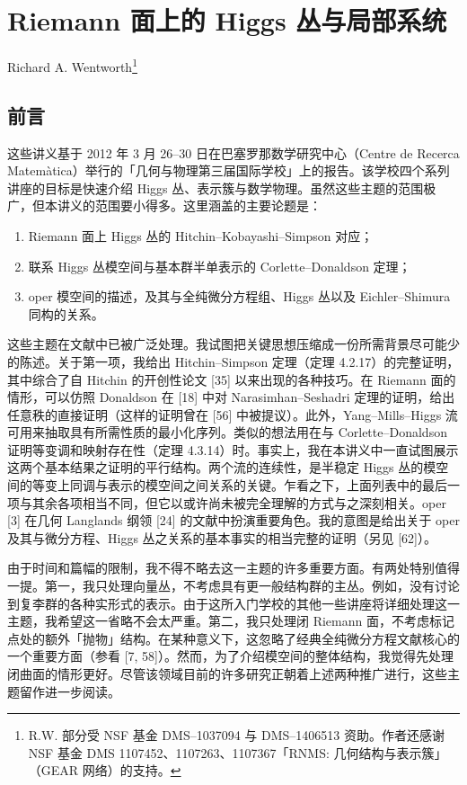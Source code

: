 \chapter{Riemann 面上的 Higgs 丛与局部系统}
\label{chap:04}

\noindent Richard A. Wentworth\footnote{R.W. 部分受 NSF 基金 DMS--1037094 与 DMS--1406513 资助。作者还感谢 NSF 基金 DMS 1107452、1107263、1107367「RNMS: 几何结构与表示簇」（GEAR 网络）的支持。}

\section{前言}

这些讲义基于 2012 年 3 月 26--30 日在巴塞罗那数学研究中心（Centre de Recerca Matem\`atica）举行的「几何与物理第三届国际学校」上的报告。该学校四个系列讲座的目标是快速介绍 Higgs 丛、表示簇与数学物理。虽然这些主题的范围极广，但本讲义的范围要小得多。这里涵盖的主要论题是：

\begin{enumerate}[label=(\roman*), leftmargin=2.6em, itemsep=0.2em]
\item Riemann 面上 Higgs 丛的 Hitchin--Kobayashi--Simpson 对应；
\item 联系 Higgs 丛模空间与基本群半单表示的 Corlette--Donaldson 定理；
\item oper 模空间的描述，及其与全纯微分方程组、Higgs 丛以及 Eichler--Shimura 同构的关系。
\end{enumerate}

这些主题在文献中已被广泛处理。我试图把关键思想压缩成一份所需背景尽可能少的陈述。关于第一项，我给出 Hitchin--Simpson 定理（定理 4.2.17）的完整证明，其中综合了自 Hitchin 的开创性论文 [35] 以来出现的各种技巧。在 Riemann 面的情形，可以仿照 Donaldson 在 [18] 中对 Narasimhan--Seshadri 定理的证明，给出任意秩的直接证明（这样的证明曾在 [56] 中被提议）。此外，Yang--Mills--Higgs 流可用来抽取具有所需性质的最小化序列。类似的想法用在与 Corlette--Donaldson 证明等变调和映射存在性（定理 4.3.14）时。事实上，我在本讲义中一直试图展示这两个基本结果之证明的平行结构。两个流的连续性，是半稳定 Higgs 丛的模空间的等变上同调与表示的模空间之间关系的关键。乍看之下，上面列表中的最后一项与其余各项相当不同，但它以或许尚未被完全理解的方式与之深刻相关。oper [3] 在几何 Langlands 纲领 [24] 的文献中扮演重要角色。我的意图是给出关于 oper 及其与微分方程、Higgs 丛之关系的基本事实的相当完整的证明（另见 [62]）。

由于时间和篇幅的限制，我不得不略去这一主题的许多重要方面。有两处特别值得一提。第一，我只处理向量丛，不考虑具有更一般结构群的主丛。例如，没有讨论到复李群的各种实形式的表示。由于这所入门学校的其他一些讲座将详细处理这一主题，我希望这一省略不会太严重。第二，我只处理闭 Riemann 面，不考虑标记点处的额外「抛物」结构。在某种意义下，这忽略了经典全纯微分方程文献核心的一个重要方面（参看 [7, 58]）。然而，为了介绍模空间的整体结构，我觉得先处理闭曲面的情形更好。尽管该领域目前的许多研究正朝着上述两种推广进行，这些主题留作进一步阅读。

